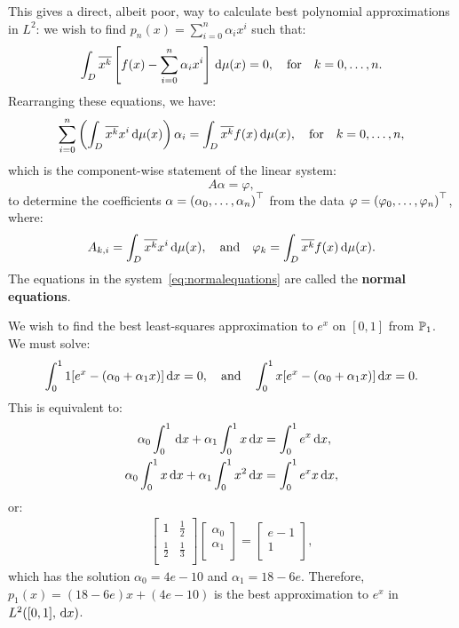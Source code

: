 This gives a direct, albeit poor, way to calculate best polynomial approximations in $L^2$: we wish to find $p_n(x) = \sum_{i=0}^n \alpha_i x^i$ such that:
\begin{equation}
\int_D \conj{x^k}\br[f(x)-\sum_{i=0}^n \alpha_i x^i]\ud\mu(x) = 0,\quad{\rm for}\quad k=0,\ldots,n.
\end{equation}
Rearranging these equations, we have:
\begin{equation}
\sum_{i=0}^n\left(\int_D\conj{x^k}x^i\ud\mu(x)\right)\alpha_i = \int_D \conj{x^k}f(x)\ud\mu(x),\quad{\rm for}\quad k=0,\ldots,n,
\end{equation}
which is the component-wise statement of the linear system:
\begin{equation}\label{eq:normalequations}
A\alpha = \varphi,
\end{equation}
to determine the coefficients $\alpha = \pr(\alpha_0,\ldots,\alpha_n)^\top$ from the data $\varphi = \pr(\varphi_0,\ldots,\varphi_n)^\top$, where:
\begin{equation}
A_{k,i} = \int_D \conj{x^k}x^i\ud\mu(x),\quad{\rm and}\quad \varphi_k = \int_D \conj{x^k}f(x)\ud\mu(x).
\end{equation}
The equations in the system~\eqref{eq:normalequations} are called the {\bf normal equations}.

\begin{example}
We wish to find the best least-squares approximation to $e^x$ on $[0,1]$ from $\P_1$. We must solve:
\[
\int_0^1 1[e^x -(\alpha_0+\alpha_1x)]\ud x = 0,\quad{\rm and}\quad \int_0^1 x[e^x -(\alpha_0+\alpha_1x)]\ud x = 0.
\]
This is equivalent to:
\begin{align*}
\alpha_0\int_0^1\ud x + \alpha_1\int_0^1x\ud x & = \int_0^1 e^x\ud x,\\
\alpha_0\int_0^1x\ud x + \alpha_1\int_0^1x^2\ud x & = \int_0^1 e^xx\ud x,
\end{align*}
or:
\begin{align*}
\begin{bmatrix}
1 & \frac{1}{2}\\
\frac{1}{2} & \frac{1}{3}\\
\end{bmatrix}
\begin{bmatrix}
\alpha_0\\\alpha_1\\
\end{bmatrix}
=
\begin{bmatrix}
e-1\\1\\
\end{bmatrix},
\end{align*}
which has the solution $\alpha_0 = 4e-10$ and $\alpha_1 = 18-6e$. Therefore, $p_1(x) = (18-6e)x + (4e-10)$ is the best approximation to $e^x$ in $L^2([0,1],\ud x)$.
\end{example}

